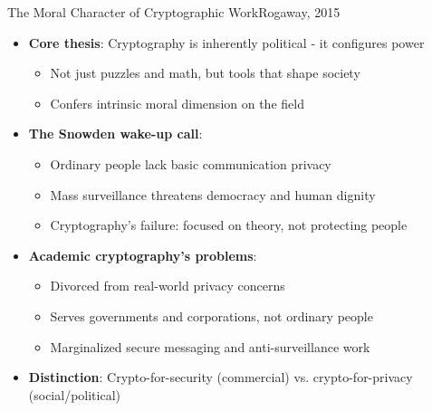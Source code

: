 \ifdefined\PRESENTATION\else\PassOptionsToClass{handout}{beamer}\fi\documentclass[aspectratio=169, lualatex]{beamer}
\begin{document}
\begin{frame}{The Moral Character of Cryptographic Work}{Rogaway, 2015}
	\begin{itemize}[<+->]
		\item \textbf{Core thesis}: Cryptography is inherently political - it configures power
		      \begin{itemize}
			      \item Not just puzzles and math, but tools that shape society
			      \item Confers intrinsic moral dimension on the field
		      \end{itemize}
		\item \textbf{The Snowden wake-up call}:
		      \begin{itemize}
			      \item Ordinary people lack basic communication privacy
			      \item Mass surveillance threatens democracy and human dignity
			      \item Cryptography's failure: focused on theory, not protecting people
		      \end{itemize}
		\item \textbf{Academic cryptography's problems}:
		      \begin{itemize}
			      \item Divorced from real-world privacy concerns
			      \item Serves governments and corporations, not ordinary people
			      \item Marginalized secure messaging and anti-surveillance work
		      \end{itemize}
		\item \textbf{Distinction}: Crypto-for-security (commercial) vs. crypto-for-privacy (social/political)
	\end{itemize}
\end{frame}
\end{document}
